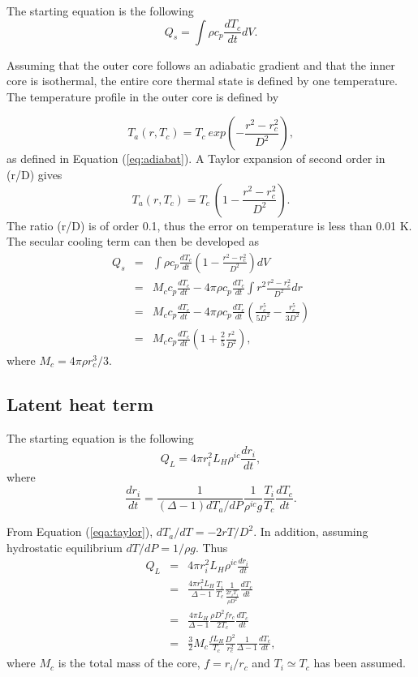 The starting equation is the following
%
\begin{equation}
Q_s = \int \rho c_p \frac{dT_c}{dt} dV.
\end{equation}

Assuming that the outer core follows an adiabatic gradient and that the inner core is isothermal, the entire core thermal state is defined by one temperature. The temperature profile in the outer core is defined by

\begin{equation} T_a(r,T_c) = T_c \: exp\left(-\frac{r^2-r_c^2}{D^2}\right), \end{equation} 
%
as defined in Equation (\ref{eq:adiabat}). A Taylor expansion of second order in (r/D) gives
%
\begin{equation} T_a(r,T_c) = T_c \: \left(1 - \frac{r^2-r_c^2}{D^2}\right). \label{eqa:taylor} \end{equation} 
%
The ratio (r/D) is of order 0.1, thus the error on temperature is less than 0.01 K. The secular
cooling term can then be developed as
%
\begin{eqnarray}
Q_s &=& \int \rho c_p \frac{dT_c}{dt} \left(1 - \frac{r^2-r_c^2}{D^2}\right) dV \nonumber \\
	&=& M_c c_p \frac{dT_c}{dt} - 4\pi\rho c_p \frac{dT_c}{dt} \int r^2 \frac{r^2-r_c^2}{D^2} dr \nonumber \\
	&=& M_c c_p \frac{dT_c}{dt} - 4\pi\rho c_p \frac{dT_c}{dt} \left(\frac{r_c^5}{5D^2} - \frac{r_c^5}{3D^2}\right) \nonumber \\
	&=& M_c c_p \frac{dT_c}{dt} \left(1 + \frac{2}{5}\frac{r^2}{D^2}\right),
\end{eqnarray}
%
where $M_c = 4\pi \rho r_c^3/3$.

\subsection*{Latent heat term}

The starting equation is the following
%
\begin{equation}
Q_L = 4 \pi r_i^2 L_H \rho^{ic} \frac{dr_i}{dt},
\end{equation}
%
where 
%
\begin{equation}
\frac{dr_i}{dt} = \frac{1}{(\Delta - 1)dT_a/dP} \frac{1}{\rho^{ic} g} \frac{T_i}{T_c} \frac{dT_c}{dt}.
\label{eqa:inner}
\end{equation}

From Equation (\ref{eqa:taylor}), $dT_a/dT = -2rT/D^2$. In addition, assuming hydrostatic equilibrium $dT/dP = 1/\rho g$. Thus
\begin{eqnarray}
Q_L &=& 4 \pi r_i^2 L_H \rho^{ic} \frac{dr_i}{dt} \nonumber \\
	&=& \frac{4 \pi r_i^2 L_H}{\Delta - 1} \frac{T_i}{T_c} \frac{1}{\frac{2r_i T_i}{\rho D^2}} \frac{dT_c}{dt} \nonumber \\
	&=& \frac{4 \pi L_H}{\Delta - 1} \frac{\rho D^2 f r_c}{2 T_c} \frac{dT_c}{dt} \nonumber \\
	&=&\frac{3}{2} M_c \frac{f L_H}{T_c} \frac{D^2}{r_c^2} \frac{1}{\Delta - 1} \frac{dT_c}{dt},
\end{eqnarray}
%
where $M_c$ is the total mass of the core, $f = r_i/r_c$ and $T_i \simeq T_c$ has been assumed.

